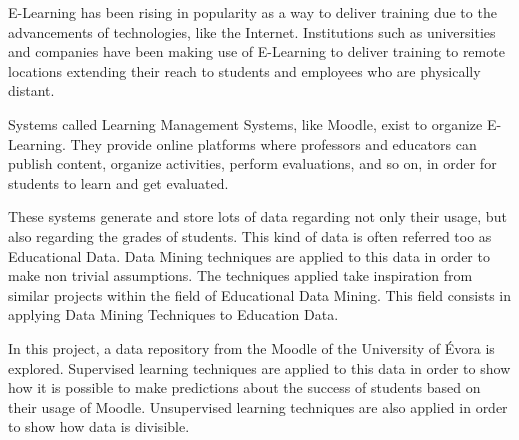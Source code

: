 \begin{tueABSTRACT}

E-Learning has been rising in popularity as a way to deliver training due to
the advancements of technologies, like the Internet. Institutions such as
universities and companies have been making use of E-Learning to deliver
training to remote locations extending their reach to students and employees
who are physically distant.

Systems called Learning Management Systems, like Moodle, exist to organize
E-Learning. They provide online platforms where professors and educators can
publish content, organize activities, perform evaluations, and so on, in order
for students to learn and get evaluated.

These systems generate and store lots of data regarding not only their usage,
but also regarding the grades of students. This kind of data is often referred
too as Educational Data. Data Mining techniques are applied to this data in
order to make non trivial assumptions. The techniques applied take inspiration
from similar projects within the field of Educational Data Mining. This field
consists in applying Data Mining Techniques to Education Data.

In this project, a data repository from the Moodle of the University of Évora
is explored. Supervised learning techniques are applied to this data in order
to show how it is possible to make predictions about the success of students
based on their usage of Moodle. Unsupervised learning techniques are also
applied in order to show how data is divisible.

\end{tueABSTRACT}
